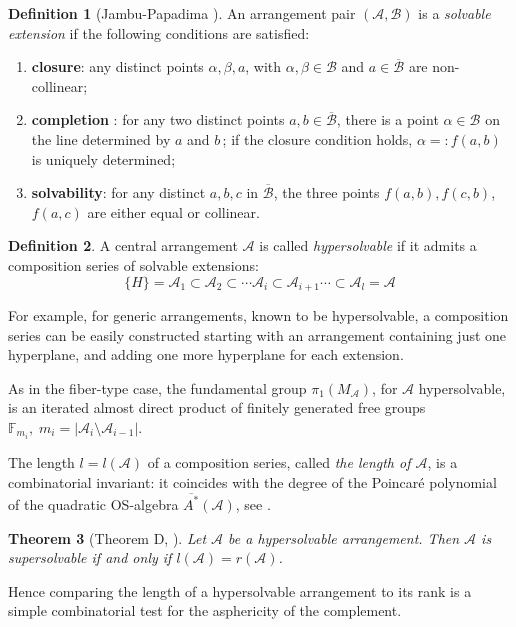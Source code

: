 \documentclass[psamsfonts]{conm-p-l}
\newtheorem{theorem}{Theorem}[section]
\theoremstyle{definition}
\newtheorem{definition}[theorem]{Definition}
\theoremstyle{remark}
\numberwithin{equation}{section}
\newcommand{\A}{{\mathcal A}}
\newcommand{\B}{{\mathcal B}}
\begin{document}
\begin{definition}[Jambu-Papadima \cite{JP1}]
\label{exthyper}
An arrangement pair 
$(\A, \B)$ is a {\em solvable extension} if the following conditions are satisfied: 
\begin{enumerate}
\item \textbf{closure}: any distinct points $\alpha, \beta, a$, with
$\alpha, \beta \in \mathcal{B}$ and $a \in \overline{\mathcal{B}}$ are non-collinear;
\item \textbf{completion} : for any two distinct points $a, b \in \overline{\mathcal{B}}$, 
there is a point $\alpha \in {\mathcal{B}}$ on the line determined by $a$ and $b \,$;
if the closure condition holds, $\alpha=:f(a,b)$ is uniquely determined;
\item \textbf{solvability}: for any distinct $a,b,c$ in $\overline{\mathcal{B}}$, 
the three points $f(a,b),f(c,b)$,
$f(a,c)$ are either equal or collinear.
\end{enumerate}
\end{definition}

\begin{definition}
\label{hyper}
A central arrangement $\A$ is called {\em hypersolvable} if it admits a 
composition series of solvable extensions:
$$
\{H\}=\A_{1}\subset \A_{2}\subset \cdots \A_{i}\subset \A_{i+1} \cdots \subset\A_{l}=\A
$$
\end{definition}
  For example, for generic arrangements, known to be hypersolvable, a composition series 
  can be easily constructed starting with an arrangement containing just one hyperplane, and
  adding one more hyperplane for each extension.
  
As in the fiber-type case, the fundamental group $\pi_1(M_{\A})$, for $\A$ hypersolvable, is 
an iterated almost direct product of finitely generated free groups 
$\mathbb{F}_{m_i}, \; m_i=|\A_i \setminus \A_{i-1}|$. 

 The length $l=l(\A)$ of a composition series, called {\it the length of $\A$}, 
 is a combinatorial invariant:
 it coincides with the degree of the Poincar\' e polynomial of 
 the quadratic OS-algebra $\overline{A^*}(\A)$, 
 see \cite[Theorem B]{JP1}.
 
\begin{theorem}[Theorem D, \cite{JP1}]
\label{thm:lr}
Let $\A$ be a hypersolvable arrangement. Then $\A$ is supersolvable 
if and only if $l(\A)=r(\A)$.
\end{theorem}

 Hence comparing the length of a hypersolvable arrangement to its rank is a simple
 combinatorial test for the asphericity of the complement.
\end{document}
